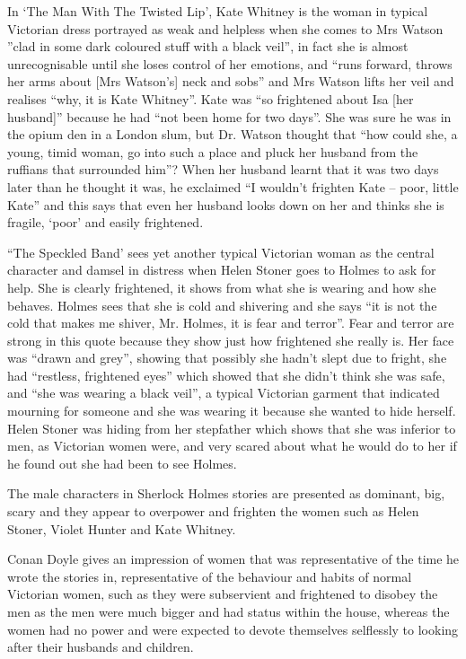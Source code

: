 \documentclass[a4paper]{article}
\begin{document}
In `The Man With The Twisted Lip', Kate Whitney is the woman in typical Victorian dress portrayed as weak and helpless when she comes to Mrs Watson ''clad in some dark coloured stuff with a black veil'', in fact she is almost unrecognisable until she loses control of her emotions, and ``runs forward, throws her arms about [Mrs Watson's] neck and sobs'' and Mrs Watson lifts her veil and realises ``why, it is Kate Whitney''.  Kate was ``so frightened about Isa [her husband]'' because he had ``not been home for two days''.  She was sure he was in the opium den in a London slum, but Dr. Watson thought that ``how could she, a young, timid woman, go into such a place and pluck her husband from the ruffians that surrounded him''?  When her husband learnt that it was two days later than he thought it was, he exclaimed ``I wouldn't frighten Kate – poor, little Kate'' and this says that even her husband looks down on her and thinks she is fragile, `poor' and easily frightened.

``The Speckled Band' sees yet another typical Victorian woman as the central character and damsel in distress when Helen Stoner goes to Holmes to ask for help.  She is clearly frightened, it shows from what she is wearing and how she behaves.  Holmes sees that she is cold and shivering and she says ``it is not the cold that makes me shiver, Mr. Holmes, it is fear and terror''.  Fear and terror are strong in this quote because they show just how frightened she really is.  Her face was ``drawn and grey”, showing that possibly she hadn't slept due to fright, she had ``restless, frightened eyes'' which showed that she didn't think she was safe, and ``she was wearing a black veil'', a typical Victorian garment that indicated mourning for someone and she was wearing it because she wanted to hide herself.  Helen Stoner was hiding from her stepfather which shows that she was inferior to men, as Victorian women were, and very scared about what he would do to her if he found out she had been to see Holmes.

The male characters in Sherlock Holmes stories are presented as dominant, big, scary and they appear to overpower and frighten the women such as Helen Stoner, Violet Hunter and Kate Whitney.

Conan Doyle gives an impression of women that was representative of the time he wrote the stories in, representative of the behaviour and habits of normal Victorian women, such as they were subservient and frightened to disobey the men as the men were much bigger and had status within the house, whereas the women had no power and were expected to devote themselves selflessly to looking after their husbands and children.
\end{document}
